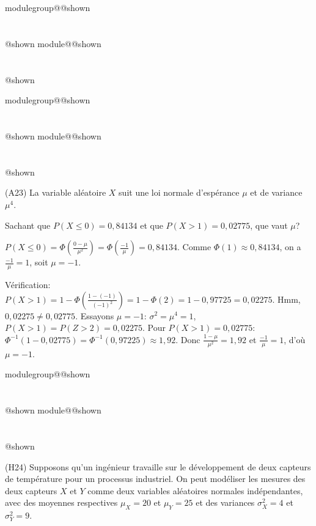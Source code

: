 \documentclass{Evaluation}
\makeatletter
\newcommand{\currentmodulekey}{}
\newcommand{\currentmoduletitle}{}
\newcommand{\currentgroupkey}{}
\newcommand{\currentgrouptitle}{}
\newcommand{\showmoduleifneeded}{%
  \ifx\currentgroupkey\empty\else
    \expandafter\ifx\csname modulegroup@\currentgroupkey @shown\endcsname\relax
      \section*{\currentgrouptitle}%
      \expandafter\gdef\csname modulegroup@\currentgroupkey @shown\endcsname{1}%
    \fi
  \fi
  \expandafter\ifx\csname module@\currentmodulekey @shown\endcsname\relax
    \section*{\currentmoduletitle}%
    \expandafter\gdef\csname module@\currentmodulekey @shown\endcsname{1}%
  \fi
}
\newenvironment{A23}{\showmoduleifneeded}{}
\newenvironment{H24}{\showmoduleifneeded}{}
\makeatother
\begin{document}
\begin{questions}
\begin{A23}
\end{A23}

\begin{A23}
\question  (A23) La variable aléatoire $X$ suit une loi normale d'espérance $\mu$ et de variance $\mu^4$.

Sachant que $P(X\leq 0)= 0,84134$ et que $P(X> 1)= 0,02775$, que vaut $\mu$?

\begin{solution}
    $P(X\leq 0)=\Phi\left(\frac{0-\mu}{\mu^2}\right)=\Phi\left(\frac{-1}{\mu}\right)=0,84134$. Comme $\Phi(1)\approx 0,84134$, on a $\frac{-1}{\mu}=1$, soit $\mu=-1$.

    Vérification: $P(X>1)=1-\Phi\left(\frac{1-(-1)}{(-1)^2}\right)=1-\Phi(2)=1-0,97725=0,02275$. Hmm, $0,02275\neq 0,02775$. Essayons $\mu=-1$: $\sigma^2=\mu^4=1$, $P(X>1)=P(Z>2)=0,02275$. Pour $P(X>1)=0,02775$: $\Phi^{-1}(1-0,02775)=\Phi^{-1}(0,97225)\approx 1,92$. Donc $\frac{1-\mu}{\mu^2}=1,92$ et $\frac{-1}{\mu}=1$, d'où $\mu=-1$.
\end{solution}
\end{A23}

\begin{H24}
\question (H24)
Supposons qu'un ingénieur travaille sur le développement de deux capteurs de température pour un processus industriel. On peut modéliser les mesures des deux capteurs $X$ et $Y$ comme deux variables aléatoires normales indépendantes, avec des moyennes respectives \( \mu_X = 20 \) et \( \mu_Y = 25 \) et des variances \( \sigma_X^2 = 4 \) et \( \sigma_Y^2 =9\).\\


\end{H24}
\end{questions}
\end{document}
